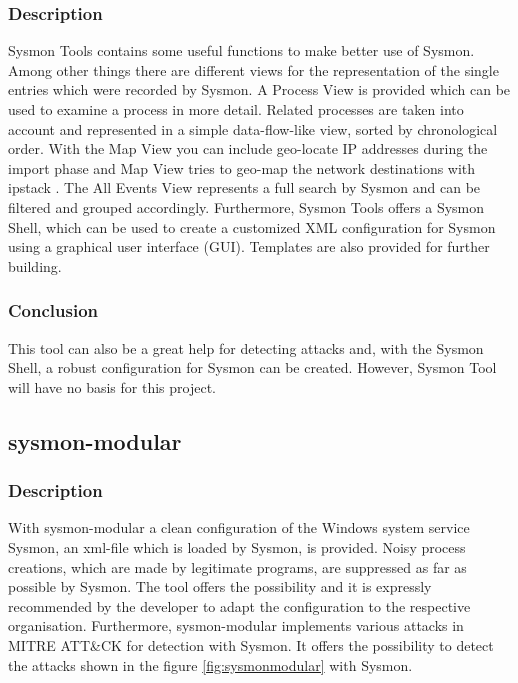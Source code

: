 \subsubsection{Description}
Sysmon Tools \cite{SysmonTools} contains some useful functions to make better use of Sysmon. Among other things there are different views for the representation of the single entries which were recorded by Sysmon. A Process View is provided which can be used to examine a process in more detail. Related processes are taken into account and represented in a simple data-flow-like view, sorted by chronological order. With the Map View you can include geo-locate IP addresses during the import phase and Map View tries to geo-map the network destinations with ipstack \cite{ipstack}. The All Events View represents a full search by Sysmon and can be filtered and grouped accordingly. Furthermore, Sysmon Tools offers a Sysmon Shell, which can be used to create a customized XML configuration for Sysmon using a graphical user interface (GUI). Templates are also provided for further building.
\subsubsection{Conclusion}
This tool can also be a great help for detecting attacks and, with the Sysmon Shell, a robust configuration for Sysmon can be created. However, Sysmon Tool will have no basis for this project.

\clearpage

\subsection{sysmon-modular}
\subsubsection{Description}
With sysmon-modular \cite{sysmon-modular} a clean configuration of the Windows system service Sysmon, an xml-file which is loaded by Sysmon, is provided. Noisy process creations, which are made by legitimate programs, are suppressed as far as possible by Sysmon. The tool offers the possibility and it is expressly recommended by the developer to adapt the configuration to the respective organisation. Furthermore, sysmon-modular implements various attacks in MITRE ATT\&CK for detection with Sysmon. It offers the possibility to detect the attacks shown in the figure \ref{fig:sysmonmodular} with Sysmon.

